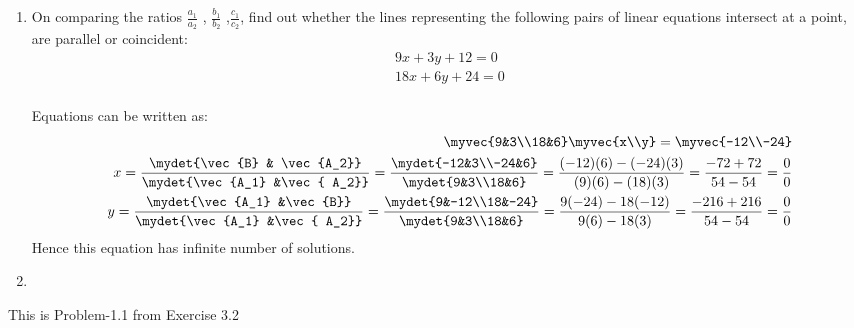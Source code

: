 %
%
\renewcommand{\theequation}{\theenumi}
\begin{enumerate}[label=\thechapter.\arabic*.,ref=\thechapter.\theenumi]
\item On comparing the ratios $\frac{a_1}{a_2}$ , $\frac{b_1}{b_2}$ ,$\frac{c_1}{c_2}$, find out whether the lines representing the following pairs of linear equations intersect at a point, are parallel or coincident:\\
\begin{align}
9x+3y+12=0\\
18x+6y+24=0
\end{align}
\solution \\
Equations can be written as:\\
\begin{align}
\myvec{9&3\\18&6} \myvec{x\\y}= \myvec{-12\\-24}\\
 x= \frac{{\mydet{\vec{B} & \vec{A_2}}}}{\mydet{\vec{A_1} &\vec{ A_2}}}
=\frac{\mydet{-12&3\\-24&6}}{\mydet{9&3\\18&6}}
=\frac{{(-12)(6) - (-24)(3)}}{{(9)(6) - (18)(3)}}
=\frac{-72+72}{54-54}
=\frac{0}{0}\\ 
 y= \frac{{\mydet{\vec{A_1} &\vec{B}}}}{\mydet{\vec{A_1} &\vec{ A_2}}}
=\frac{\mydet{9&-12\\18&-24}}{\mydet{9&3\\18&6}}
=\frac{9(-24) - 18(-12)}{9(6) -18 (3)}
=\frac{-216+216}{54-54}
=\frac{0}{0}
\end{align}
Hence this equation has infinite number of solutions.
\item
\end{enumerate}
This is Problem-1.1 from Exercise 3.2
